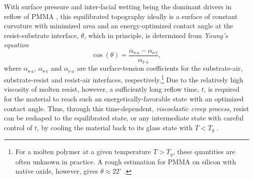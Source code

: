 With surface pressure and inter-facial wetting being the dominant drivers in reflow of PMMA \cite{Kirchner19}, this equilibrated topography ideally is a surface of constant curvature with minimized area and an energy-optimized contact angle at the resist-substrate interface, $\theta$, which in principle, is determined from \emph{Young's equation} \cite{landau2013statistical}
\begin{equation}\label{eq:contact_angle}
 \cos \left( \theta \right) = \frac{\alpha_{\text{s-a}} - \alpha_{\text{s-r}}}{\alpha_{\text{r-a}}} ,
 \end{equation}
where $\alpha_{\text{s-a}}$, $\alpha_{\text{s-r}}$ and $\alpha_{\text{r-a}}$ are the surface-tension coefficients for the substrate-air, substrate-resist and resist-air interfaces, respectively.\footnote{For a molten polymer at a given temperature $T > T_g$, these quantities are often unknown in practice. A rough estimation for PMMA on silicon with native oxide, however, gives $\theta \approx 22^{\circ}$ \cite{Kirchner14}.} 
Due to the relatively high viscosity of molten resist, however, a sufficiently long reflow time, $t$, is required for the material to reach such an energetically-favorable state with an optimized contact angle. 
Thus, through this time-dependent, \emph{viscoelastic creep process}, resist can be reshaped to the equilibrated state, or any intermediate state with careful control of $t$, by cooling the material back to its glass state with $T < T_g$ \cite{Kirchner14,Kirchner14a,Kirchner19}. 

